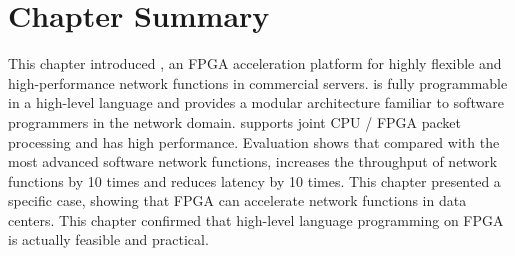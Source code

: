 \section{Chapter Summary}
\label{clicknp:sec:conclusion}

This chapter introduced \name, an FPGA acceleration platform for highly flexible and high-performance network functions in commercial servers. \name is fully programmable in a high-level language and provides a modular architecture familiar to software programmers in the network domain. \name supports joint CPU / FPGA packet processing and has high performance. Evaluation shows that compared with the most advanced software network functions, \name increases the throughput of network functions by 10 times and reduces latency by 10 times. This chapter presented a specific case, showing that FPGA can accelerate network functions in data centers. This chapter confirmed that high-level language programming on FPGA is actually feasible and practical.
